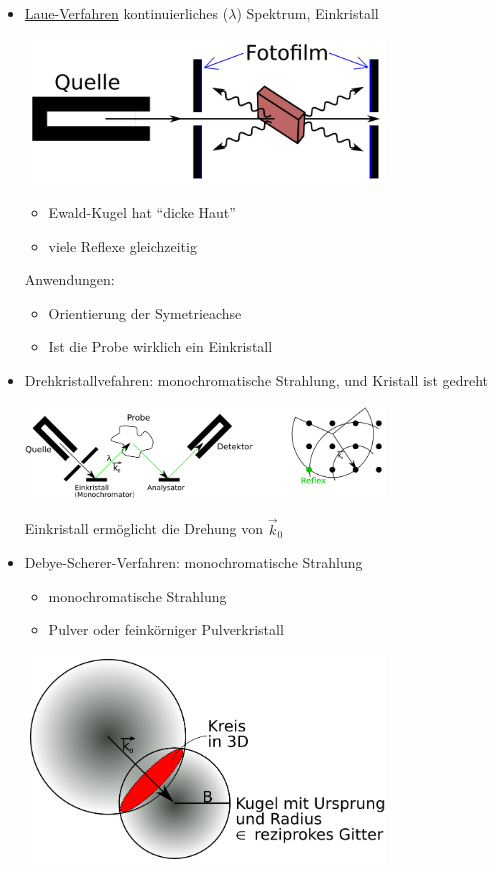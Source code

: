 \begin{itemize}
\item \underline{Laue-Verfahren} kontinuierliches (\(\lambda\))
  Spektrum, Einkristall

\includegraphics[width=0.75\textwidth]{kap03_06.png}


\begin{itemize}
\item Ewald-Kugel hat ``dicke Haut''
\item viele Reflexe gleichzeitig
\end{itemize}

Anwendungen:
 \begin{itemize}
 \item Orientierung der Symetrieachse
 \item Ist die Probe wirklich ein Einkristall
 \end{itemize}

\item Drehkristallvefahren: monochromatische Strahlung, und Kristall
  ist gedreht

\includegraphics[width=0.75\textwidth]{kap03_07.png}

Einkristall ermöglicht die Drehung von \(\vec k_0\)

\item Debye-Scherer-Verfahren: monochromatische Strahlung

  \begin{itemize}
  \item monochromatische Strahlung
  \item Pulver oder feinkörniger Pulverkristall
  \end{itemize}


\includegraphics[width=0.75\textwidth]{kap03_08.png}


\end{itemize}
